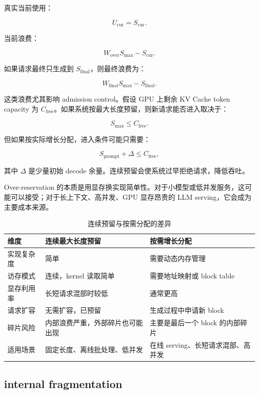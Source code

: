 真实当前使用：

\[
U_{\mathrm{cur}}=S_{\mathrm{cur}}.
\]

当前浪费：

\[
W_{\mathrm{over}}
S_{\max}-S_{\mathrm{cur}}.
\]

如果请求最终只生成到 $S_{\mathrm{final}}$，则最终浪费为：

\[
W_{\mathrm{final}}
S_{\max}-S_{\mathrm{final}}.
\]

这类浪费尤其影响 admission control。假设 GPU 上剩余 KV Cache token capacity 为 $C_{\mathrm{free}}$。如果系统按最大长度预留，则新请求能否进入取决于：

\[
S_{\max}\le C_{\mathrm{free}}.
\]

但如果按实际增长分配，进入条件可能只需要：

\[
S_{\mathrm{prompt}}+\Delta \le C_{\mathrm{free}},
\]

其中 $\Delta$ 是少量初始 decode 余量。连续预留会使系统过早拒绝请求，降低吞吐。

Over-reservation 的本质是用显存换实现简单性。对于小模型或低并发服务，这可能可以接受；对于长上下文、高并发、GPU 显存昂贵的 LLM serving，它会成为主要成本来源。

\begin{table}[H]
\centering
\small
\caption{连续预留与按需分配的差异}
\label{tab:over-reservation-vs-demand-allocation}
\begin{tabular}{p{}p{}p{}}
\hline
\textbf{维度} & \textbf{连续最大长度预留} & \textbf{按需增长分配} \\
\hline
实现复杂度
& 简单
& 需要动态内存管理 \\
\hline
访存模式
& 连续，kernel 读取简单
& 需要地址映射或 block table \\
\hline
显存利用率
& 长短请求混部时较低
& 通常更高 \\
\hline
请求扩容
& 无需扩容，已预留
& 生成过程中申请新 block \\
\hline
碎片风险
& 内部浪费严重，外部碎片也可能出现
& 主要是最后一个 block 的内部碎片 \\
\hline
适用场景
& 固定长度、离线批处理、低并发
& 在线 serving、长短请求混部、高并发 \\
\hline
\end{tabular}
\end{table}

\subsection{internal fragmentation}
\label{subsec:internal-fragmentation}

